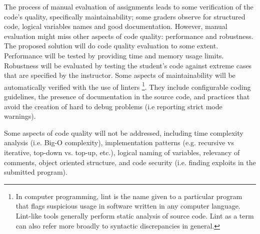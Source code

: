 The process of manual evaluation of assignments leads to some verification of
the code's quality, specifically maintainability; some graders observe for
structured code, logical variables names and good documentation. However, manual
evaluation might miss other aspects of code quality: performance and robustness.
The proposed solution will do code quality evaluation to some extent.
Performance will be tested by providing time and memory usage limits. Robustness
will be evaluated by testing the student's code against extreme cases that are
specified by the instructor. Some aspects of maintainability will be
automatically verified with the use of linters \footnote{In computer
programming, lint is the name given to a particular program that flags
suspicious usage in software written in any computer language. Lint-like tools
generally perform static analysis of source code. Lint as a term can also refer
more broadly to syntactic discrepancies in general.}. They include configurable
coding guidelines, the presence of documentation in the source code, and
practices that avoid the creation of hard to debug problems (i.e reporting
strict mode warnings).

Some aspects of code quality will not be addressed, including time complexity
analysis (i.e. Big-O complexity), implementation patterns (e.g. recursive vs
iterative, top-down vs. top-up, etc.), logical naming of variables, relevancy of
comments, object oriented structure, and code security (i.e. finding exploits in
the submitted program).
